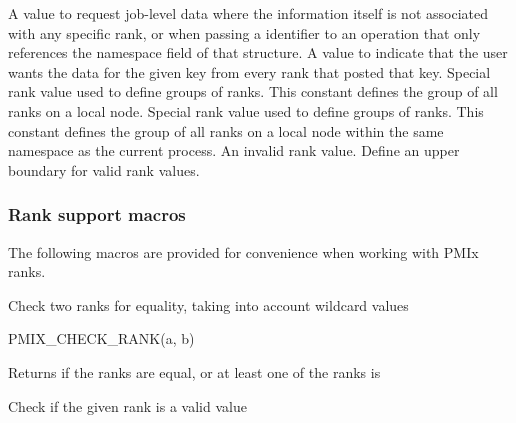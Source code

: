 \begin{constantdesc}
%
A value to request job-level data where the information itself is not associated with any specific rank, or when passing a  identifier to an operation that only references the namespace field of that structure.
%
A value to indicate that the user wants the data for the given key from every rank that posted that key.
%
Special rank value used to define groups of ranks.
This constant defines the group of all ranks on a local node.
%
Special rank value used to define groups of ranks.
This constant defines the group of all ranks on a local node within the same namespace as the current process.
%
An invalid rank value.
%
Define an upper boundary for valid rank values.
%
\end{constantdesc}


\subsubsection{Rank support macros}

The following macros are provided for convenience when working with \ac{PMIx} ranks.


Check two ranks for equality, taking into account wildcard values

\cspecificstart
\begin{codepar}
PMIX_CHECK_RANK(a, b)
\end{codepar}
\cspecificend

\begin{arglist}
\end{arglist}

Returns  if the ranks are equal, or at least one of the ranks is 


Check if the given rank is a valid value


